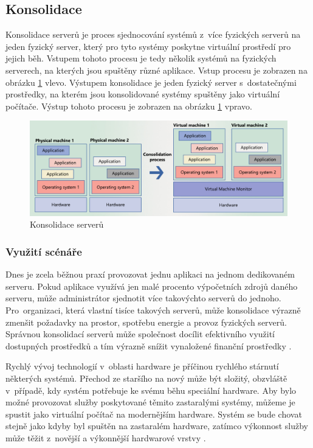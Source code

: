 \subsection{Konsolidace}
\label{chapter:virtualization:deployment:consolidation}
Konsolidace serverů je proces sjednocování systémů z~více fyzických serverů na jeden fyzický server, který pro tyto systémy
poskytne virtuální prostředí pro jejich běh. Vstupem tohoto procesu je tedy několik systémů na fyzických serverech, na kterých
jsou spuštěny různé aplikace. Vstup procesu je zobrazen na obrázku \ref{figure:consolidation_img} vlevo. Výstupem konsolidace
je jeden fyzický server s~dostatečnými prostředky, na kterém jsou konsolidované systémy spuštěny jako virtuální počítače.
Výstup tohoto procesu je zobrazen na obrázku \ref{figure:consolidation_img} vpravo.
\begin{figure}
    \centering    
    \label{figure:consolidation_img}
    \includegraphics[scale=0.51]{assets/pdfs/consolidation.pdf}
    \caption{Konsolidace serverů}    
\end{figure}
\subsubsection{Využití scénáře}
\label{chapter:virtualization:deployment:consolidation:use}
Dnes je zcela běžnou praxí provozovat jednu aplikaci na jednom dedikovaném serveru. Pokud aplikace využívá jen malé procento
výpočetních zdrojů daného serveru, může administrátor sjednotit více takovýchto serverů do jednoho. Pro~organizaci, která vlastní
tisíce takových serverů, může konsolidace výrazně zmenšit požadavky na prostor, spotřebu energie a provoz fyzických serverů.
Správnou konsolidací serverů může společnost docílit efektivního využití dostupných prostředků a tím výrazně snížit vynaložené
finanční prostředky \cite{oracle:virtualization:reasons}.

Rychlý vývoj technologií v~oblasti hardware je příčinou rychlého stárnutí některých systémů. Přechod ze staršího na nový může
být složitý, obzvláště v~případě, kdy systém potřebuje ke svému běhu speciální hardware. Aby bylo možné provozovat služby poskytované
těmito zastaralými systémy, můžeme je spustit jako virtuální počítač na modernějším hardware. Systém se bude chovat stejně jako
kdyby byl spuštěn na zastaralém hardware, zatímco výkonnost služby může těžit z~novější a výkonnější hardwarové vrstvy
\cite{oracle:virtualization:reasons}.

